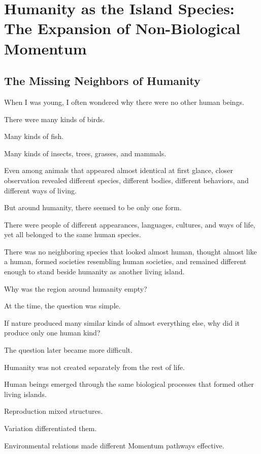 

\section{Humanity as the Island Species: The Expansion of Non-Biological Momentum}

\subsection*{\textbf{The Missing Neighbors of Humanity}}


When I was young, I often wondered why there were no other human beings.

There were many kinds of birds.

Many kinds of fish.

Many kinds of insects, trees, grasses, and mammals.

Even among animals that appeared almost identical at first glance, closer observation revealed different species, different bodies, different behaviors, and different ways of living.

But around humanity, there seemed to be only one form.

There were people of different appearances, languages, cultures, and ways of life, yet all belonged to the same human species.

There was no neighboring species that looked almost human, thought almost like a human, formed societies resembling human societies, and remained different enough to stand beside humanity as another living island.

Why was the region around humanity empty?

At the time, the question was simple.

If nature produced many similar kinds of almost everything else, why did it produce only one human kind?

The question later became more difficult.

Humanity was not created separately from the rest of life.

Human beings emerged through the same biological processes that formed other living islands.

Reproduction mixed structures.

Variation differentiated them.

Environmental relations made different Momentum pathways effective.

